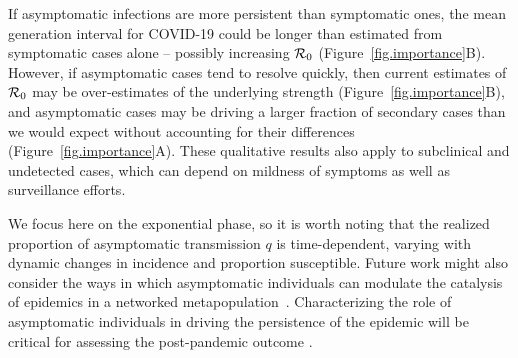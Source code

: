 If asymptomatic infections are more persistent than symptomatic ones, the mean generation interval for COVID-19 could be longer than estimated from symptomatic cases alone -- possibly increasing ${\cal{R}}_0$ (Figure~\ref{fig.importance}B).
However, if asymptomatic cases tend to resolve quickly, then current estimates of ${\cal{R}}_0$ may be over-estimates of the underlying strength (Figure~\ref{fig.importance}B), and asymptomatic cases may be driving a larger fraction of secondary cases than we would expect without accounting for their differences (Figure~\ref{fig.importance}A).
These qualitative results also apply to subclinical and undetected cases, which can depend on mildness of symptoms as well as surveillance efforts.

We focus here on the exponential phase, so it is worth noting that the realized proportion of asymptomatic transmission $q$ is time-dependent, varying with dynamic changes in incidence and proportion susceptible. 
Future work might also consider the ways in which asymptomatic individuals can modulate the catalysis of epidemics in a networked metapopulation~\citep{watts_pnas2005, chinazzi2020effect, du2020risk}.
Characterizing the role of asymptomatic individuals in driving the persistence of the epidemic will be critical for assessing the post-pandemic outcome \citep{lipsitch_preprint}.
